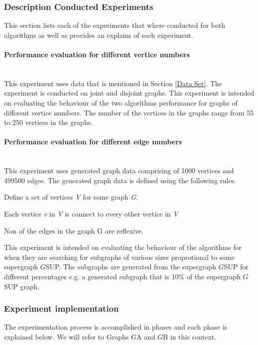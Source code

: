 \subsubsection{Description Conducted Experiments}
\label{Description Conducted Experiments}
This section lists each of the experiments that where conducted for both algorithms as well as provides an explains of each experiment.
\paragraph{Performance evaluation for different vertice numbers}\mbox{}\\
\label{Performance evaluation for different vertice numbers}
This experiment uses data that is mentioned in Section \ref{Data Set}. The experiment is conducted on joint and disjoint graphs. This experiment is intended on evaluating the behaviour of the two algorithms performance for graphs of 
different vertice numbers. The number of the vertices in the graphs range from 55 to 250 vertices in the graphs.

\paragraph{Performance evaluation for different edge numbers}\mbox{}\\
This experiment uses generated graph data comprising of 1000 vertices and 499500 edges. The generated graph data is defined using the following rules.
\begin{myEnumerate}
  \item Define a set of vertices \textit{V} for some graph \textit{G}.
  \item Each vertice \textit{v} in \textit{V} is connect to every other vertice in \textit{V}
  \item Non of the edges in the graph G are reflexive.
\end{myEnumerate}
This experiment is intended on evaluating the behaviour of the algorithms for when they are searching for subgraphs of various sizes proprotional to some 
 supergraph $G${\tiny SUP}.\newline
The subgraphs are generated from the supergraph $G${\tiny SUP} for different percentages e.g. a generated subgraph that is 10\% of the supergraph $G${\tiny SUP} graph.

\subsubsection{Experiment implementation}
The experimentation process is accomplished in phases and each phase is explained below. We will refer to Graphs $G${\tiny A} and $G${\tiny B} in this context.
